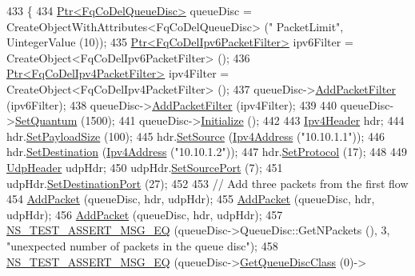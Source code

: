 \begin{DoxyCode}
433 \{
434   \hyperlink{classns3_1_1Ptr}{Ptr<FqCoDelQueueDisc>} queueDisc = CreateObjectWithAttributes<FqCoDelQueueDisc> (\textcolor{stringliteral}{"
      PacketLimit"}, UintegerValue (10));
435   \hyperlink{classns3_1_1Ptr}{Ptr<FqCoDelIpv6PacketFilter>} ipv6Filter = 
      CreateObject<FqCoDelIpv6PacketFilter> ();
436   \hyperlink{classns3_1_1Ptr}{Ptr<FqCoDelIpv4PacketFilter>} ipv4Filter = 
      CreateObject<FqCoDelIpv4PacketFilter> ();
437   queueDisc->\hyperlink{classns3_1_1QueueDisc_a45efdc512f64cb8e0d57ad4f208ed4b7}{AddPacketFilter} (ipv6Filter);
438   queueDisc->\hyperlink{classns3_1_1QueueDisc_a45efdc512f64cb8e0d57ad4f208ed4b7}{AddPacketFilter} (ipv4Filter);
439 
440   queueDisc->\hyperlink{classns3_1_1FqCoDelQueueDisc_a3d7f222490f1df11be26ee4b3f0dfce5}{SetQuantum} (1500);
441   queueDisc->\hyperlink{classns3_1_1Object_af4411cb29971772fcd09203474a95078}{Initialize} ();
442 
443   \hyperlink{classns3_1_1Ipv4Header}{Ipv4Header} hdr;
444   hdr.\hyperlink{classns3_1_1Ipv4Header_a3e961181f7839619a68bb7a2dcd483b0}{SetPayloadSize} (100);
445   hdr.\hyperlink{classns3_1_1Ipv4Header_af3c8c140e302ec4aa1dc885ce1dcc070}{SetSource} (\hyperlink{classns3_1_1Ipv4Address}{Ipv4Address} (\textcolor{stringliteral}{"10.10.1.1"}));
446   hdr.\hyperlink{classns3_1_1Ipv4Header_a154e584fb5418de7a5ce34dbb852de02}{SetDestination} (\hyperlink{classns3_1_1Ipv4Address}{Ipv4Address} (\textcolor{stringliteral}{"10.10.1.2"}));
447   hdr.\hyperlink{classns3_1_1Ipv4Header_aca424df8132b7717fb4c315fcb4ce4bf}{SetProtocol} (17);
448 
449   \hyperlink{classns3_1_1UdpHeader}{UdpHeader} udpHdr;
450   udpHdr.\hyperlink{classns3_1_1UdpHeader_ae10a7c9c6cbd645745bebc2a84a78831}{SetSourcePort} (7);
451   udpHdr.\hyperlink{classns3_1_1UdpHeader_af7f8bc1749481efe8ede173a71aa6727}{SetDestinationPort} (27);
452 
453   \textcolor{comment}{// Add three packets from the first flow}
454   \hyperlink{classFqCoDelQueueDiscUDPFlowsSeparation_a632c0fbc4d46616fedb0b9ab9f75e769}{AddPacket} (queueDisc, hdr, udpHdr);
455   \hyperlink{classFqCoDelQueueDiscUDPFlowsSeparation_a632c0fbc4d46616fedb0b9ab9f75e769}{AddPacket} (queueDisc, hdr, udpHdr);
456   \hyperlink{classFqCoDelQueueDiscUDPFlowsSeparation_a632c0fbc4d46616fedb0b9ab9f75e769}{AddPacket} (queueDisc, hdr, udpHdr);
457   \hyperlink{group__testing_ga2a9d78cffb3db8e867c35fff0b698cf5}{NS\_TEST\_ASSERT\_MSG\_EQ} (queueDisc->QueueDisc::GetNPackets (), 3, \textcolor{stringliteral}{"unexpected number
       of packets in the queue disc"});
458   \hyperlink{group__testing_ga2a9d78cffb3db8e867c35fff0b698cf5}{NS\_TEST\_ASSERT\_MSG\_EQ} (queueDisc->\hyperlink{classns3_1_1QueueDisc_a584d228f7bff3f754d32793a38134556}{GetQueueDiscClass} (0)->

\end{DoxyCode}
